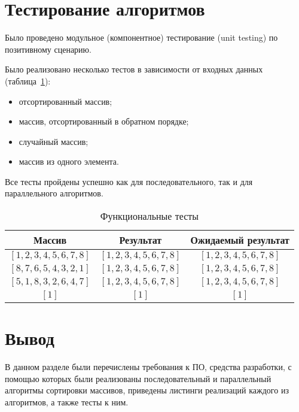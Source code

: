 \section{Тестирование алгоритмов}

Было проведено модульное (компонентное) тестирование (unit testing) по позитивному сценарию.

Было реализовано несколько тестов в зависимости от входных данных (таблица~\ref{tbl:func_test}):
\begin{itemize}
	\item отсортированный массив;
	\item массив, отсортированный в обратном порядке;
	\item случайный массив;
	\item массив из одного элемента.
\end{itemize}

Все тесты пройдены успешно как для последовательного, так и для параллельного алгоритмов.

\begin{table}[h]
	\begin{center}
		\begin{threeparttable}
			\captionsetup{justification=raggedright,singlelinecheck=off}
			\caption{\label{tbl:func_test} Функциональные тесты}
			\begin{tabular}{|c|c|c|}
				\hline
				Массив & Результат & Ожидаемый результат \\ 
				\hline
				$[1, 2, 3, 4, 5, 6, 7 , 8]$ & $[1, 2, 3, 4, 5, 6, 7, 8]$ & $[1, 2, 3, 4, 5, 6, 7, 8]$ \\
				\hline
				$[8, 7, 6, 5, 4, 3, 2, 1]$ & $[1, 2, 3, 4, 5, 6, 7, 8]$ & $[1, 2, 3, 4, 5, 6, 7, 8]$ \\
				\hline
				$[5, 1, 8, 3, 2, 6, 4, 7]$ & $[1, 2, 3, 4, 5, 6, 7, 8]$ & $[1, 2, 3, 4, 5, 6, 7, 8]$ \\
				\hline
				$[1]$ & $[1]$ & $[1]$ \\
				\hline
			\end{tabular}
		\end{threeparttable}
	\end{center}
	
\end{table}

\section*{Вывод}
В данном разделе были перечислены требования к ПО, средства разработки, с помощью которых были реализованы последовательный и параллельный алгоритмы сортировки массивов, приведены листинги реализаций каждого из алгоритмов, а также тесты к ним.


